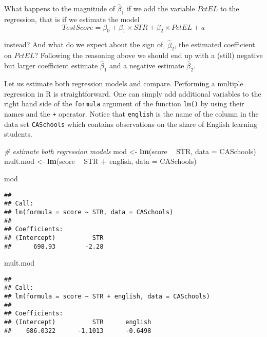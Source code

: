 \documentclass[]{book}
\newenvironment{Shaded}{\begin{snugshade}}{\end{snugshade}}
\newcommand{\KeywordTok}[1]{\textcolor[rgb]{0.13,0.29,0.53}{\textbf{#1}}}
\newcommand{\DataTypeTok}[1]{\textcolor[rgb]{0.13,0.29,0.53}{#1}}
\newcommand{\StringTok}[1]{\textcolor[rgb]{0.31,0.60,0.02}{#1}}
\newcommand{\CommentTok}[1]{\textcolor[rgb]{0.56,0.35,0.01}{\textit{#1}}}
\newcommand{\OperatorTok}[1]{\textcolor[rgb]{0.81,0.36,0.00}{\textbf{#1}}}
\newcommand{\NormalTok}[1]{#1}
\theoremstyle{definition}
\theoremstyle{definition}
\theoremstyle{definition}
\theoremstyle{remark}
\begin{document}
What happens to the magnitude of \(\hat\beta_1\) if we add the variable
\(PctEL\) to the regression, that is if we estimate the model
\[ TestScore = \beta_0 + \beta_1 \times STR + \beta_2 \times PctEL + u \]

instead? And what do we expect about the sign of, \(\hat\beta_2\), the
estimated coefficient on \(PctEL\)? Following the reasoning above we
should end up with a (still) negative but larger coefficient estimate
\(\hat\beta_1\) and a negative estimate \(\hat\beta_2\).

Let us estimate both regression models and compare. Performing a
multiple regression in R is straightforward. One can simply add
additional variables to the right hand side of the \texttt{formula}
argument of the function \texttt{lm()} by using their names and the
\texttt{+} operator. Notice that \texttt{english} is the name of the
column in the data set \texttt{CASchools} which contains observations on
the share of English learning students.

\begin{Shaded}
\begin{Highlighting}[]
\CommentTok{# estimate both regression models}
\NormalTok{mod <-}\StringTok{ }\KeywordTok{lm}\NormalTok{(score }\OperatorTok{~}\StringTok{ }\NormalTok{STR, }\DataTypeTok{data =}\NormalTok{ CASchools) }
\NormalTok{mult.mod <-}\StringTok{ }\KeywordTok{lm}\NormalTok{(score }\OperatorTok{~}\StringTok{ }\NormalTok{STR }\OperatorTok{+}\StringTok{ }\NormalTok{english, }\DataTypeTok{data =}\NormalTok{ CASchools)}

\NormalTok{mod}
\end{Highlighting}
\end{Shaded}

\begin{verbatim}
## 
## Call:
## lm(formula = score ~ STR, data = CASchools)
## 
## Coefficients:
## (Intercept)          STR  
##      698.93        -2.28
\end{verbatim}

\begin{Shaded}
\begin{Highlighting}[]
\NormalTok{mult.mod}
\end{Highlighting}
\end{Shaded}

\begin{verbatim}
## 
## Call:
## lm(formula = score ~ STR + english, data = CASchools)
## 
## Coefficients:
## (Intercept)          STR      english  
##    686.0322      -1.1013      -0.6498
\end{verbatim}
\end{document}
